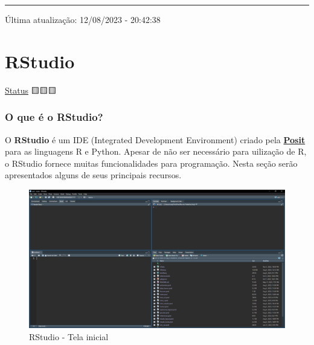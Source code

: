 \documentclass[
  letterpaper,
  DIV=11,
  numbers=noendperiod]{scrreprt}
\begin{document}
\begin{center}\rule{0.5\linewidth}{0.5pt}\end{center}

Última atualização: 12/08/2023 - 20:42:38

\part{RStudio}

\protect\hyperlink{status-do-material}{Status} 🟨🟨🟨

\hypertarget{o-que-uxe9-o-rstudio}{%
\section*{O que é o RStudio?}\label{o-que-uxe9-o-rstudio}}


O \textbf{RStudio} é um IDE (Integrated Development Environment) criado
pela \href{https://posit.co/}{\textbf{Posit}} para as linguagens R e
Python. Apesar de não ser necessário para uilização de R, o RStudio
fornece muitas funcionalidades para programação. Nesta seção serão
apresentados alguns de seus principais recursos.

\begin{figure}

{\centering \includegraphics{./images/rstudio/rstudio_layout.png}

}

\caption{\label{fig-rstudio}RStudio - Tela inicial}

\end{figure}
\end{document}
